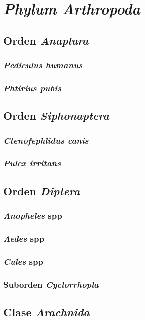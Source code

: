 \chapter{\textit{Phylum Arthropoda}}
\section{Orden \textit{Anaplura}}
\subsection{\textit{Pediculus humanus}}
\subsection{\textit{Phtirius pubis}}
\section{Orden \textit{Siphonaptera}}
\subsection{\textit{Ctenofephlidus canis}}
\subsection{\textit{Pulex irritans}}
\section{Orden \textit{Diptera}}
\subsection{\textit{Anopheles} spp}
\subsection{\textit{Aedes} spp}
\subsection{\textit{Cules} spp}
\subsection{Suborden \textit{Cyclorrhopla}} %
\section{Clase \textit{Arachnida}}
